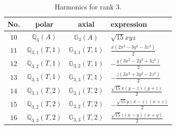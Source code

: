 \documentclass[fleqn,8pt,landscape]{jsarticle}
\begin{document}
\begin{table}[ht!]
\begin{center}
\caption{Harmonics for rank 3.}
\renewcommand{\arraystretch}{1.3}
\begin{tabular}{cccl} \hline \hline
No. & polar & axial & expression \\ \hline
$ 10 $ & $ \mathbb{Q}_{3}(A) $ & $ \mathbb{G}_{3}(A) $ & $ \sqrt{15} x y z $ \\
$ 11 $ & $ \mathbb{Q}_{3,1}(T,1) $ & $ \mathbb{G}_{3,1}(T,1) $ & $ \frac{x \left(2 x^{2} - 3 y^{2} - 3 z^{2}\right)}{2} $ \\
$ 12 $ & $ \mathbb{Q}_{3,2}(T,1) $ & $ \mathbb{G}_{3,2}(T,1) $ & $ - \frac{y \left(3 x^{2} - 2 y^{2} + 3 z^{2}\right)}{2} $ \\
$ 13 $ & $ \mathbb{Q}_{3,3}(T,1) $ & $ \mathbb{G}_{3,3}(T,1) $ & $ - \frac{z \left(3 x^{2} + 3 y^{2} - 2 z^{2}\right)}{2} $ \\
$ 14 $ & $ \mathbb{Q}_{3,1}(T,2) $ & $ \mathbb{G}_{3,1}(T,2) $ & $ \frac{\sqrt{15} x \left(y - z\right) \left(y + z\right)}{2} $ \\
$ 15 $ & $ \mathbb{Q}_{3,2}(T,2) $ & $ \mathbb{G}_{3,2}(T,2) $ & $ - \frac{\sqrt{15} y \left(x - z\right) \left(x + z\right)}{2} $ \\
$ 16 $ & $ \mathbb{Q}_{3,3}(T,2) $ & $ \mathbb{G}_{3,3}(T,2) $ & $ \frac{\sqrt{15} z \left(x - y\right) \left(x + y\right)}{2} $ \\
 \hline \hline
\end{tabular}
\end{center}
\end{table}
\end{document}

